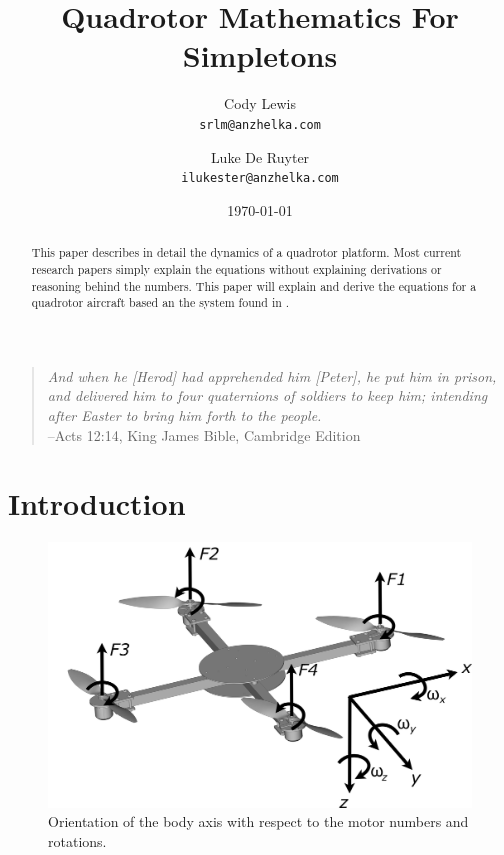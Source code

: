\documentclass{article}
\numberwithin{equation}{section} %
\begin{document}
\title{Quadrotor Mathematics For Simpletons}
\author{Cody Lewis \\ \texttt{srlm@anzhelka.com} \and Luke De Ruyter \\ \texttt{ilukester@anzhelka.com} }
\date{\today}
\maketitle
\begin{verse}\textit{
And when he [Herod] had apprehended him [Peter], he put him in prison, and delivered him to four quaternions of soldiers to keep him; intending after Easter to bring him forth to the people.} \\
\hfill --Acts 12:14, King James Bible, Cambridge Edition
\end{verse}

\begin{abstract}
This paper describes in detail the dynamics of a quadrotor platform. Most current research papers simply explain the equations without explaining derivations or reasoning behind the numbers. This paper will explain and derive the equations for a quadrotor aircraft based an the system found in \cite{stingu09}.
\end{abstract}

\section{Introduction}

\begin{figure}[h!]
  \centering
	\includegraphics[scale=.05]{reference_frame_diagram.jpg}
  \caption{Orientation of the body axis with respect to the motor numbers and rotations.}
\end{figure}  
\end{document}
